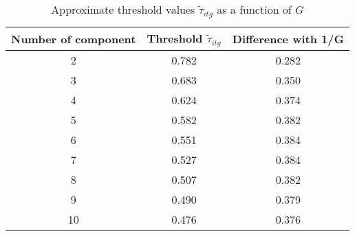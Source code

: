 \documentclass[11pt,letter]{article}
\begin{document}
\begin{table}[h!]
	\centering
	\begin{tabular}{||c |c |c||} 
		\hline
		Number of component & Threshold $\tilde{\tau}_{itg}$ & Difference with 1/G \\ [0.5ex] 
		\hline\hline
		2 & 0.782 &0.282\\
		3 & 0.683 &0.350\\
		4 & 0.624 &0.374\\
		5 & 0.582 &0.382\\ 
		6 & 0.551 &0.384\\ 
		7 & 0.527 &0.384\\
		8 & 0.507 &0.382\\
		9 & 0.490 &0.379\\
		10 & 0.476 &0.376\\[1ex]
		\hline
	\end{tabular}
\caption{Approximate threshold values $\tilde{\tau}_{itg}$ as a function of $G$}
\end{table}
\newpage
\end{document}
